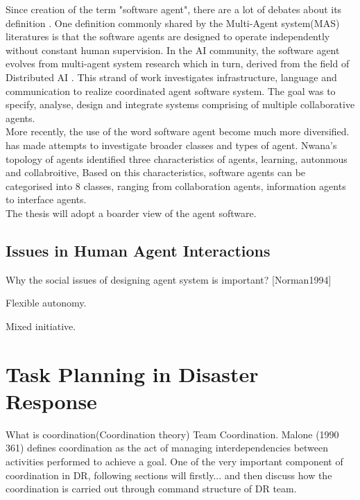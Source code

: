 Since creation of the term "software agent", there are a lot of debates about its definition . One definition commonly shared by the Multi-Agent system(MAS) literatures is that the software agents are designed to operate independently without constant human supervision. In the AI community, the software agent evolves from multi-agent system research which in turn, derived from the field of Distributed AI \cite{Vlassis2007}. This strand of work investigates infrastructure, language and communication to realize coordinated agent software system. The goal was to specify, analyse, design and integrate systems comprising of multiple collaborative agents.\cite{Nwana1996} \\

More recently, the use of the word software agent become much more diversified. \cite{Nwana1996} has made attempts to investigate broader classes and types of agent. Nwana's \cite{Nwana1996} topology of agents identified three characteristics of agents, learning, autonmous and collabroitive, Based on this characteristics, software agents can be categorised into 8 classes, ranging from collaboration agents, information agents to interface agents. \\

The thesis will adopt a boarder view of the agent software. \\

\subsection{ Issues in Human Agent Interactions }

Why the social issues of designing agent system is important? [Norman1994]

Flexible autonomy.

Mixed initiative.

\section{Task Planning in Disaster Response}\label{ch:teams}

What is coordination(Coordination theory) Team Coordination. Malone (1990 361) defines coordination as the act of managing interdependencies between activities performed to achieve a goal. One of the very important component of coordination in DR, following sections will firstly... and then discuss how the coordination is carried out through command structure of DR team. 

